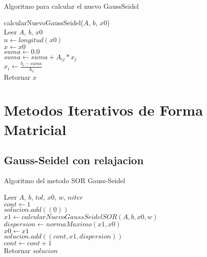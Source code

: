 \documentclass[12pt]{article}
\begin{document}
        \begin{algorithm}[H]
            \caption{Algoritmo para calcular el nuevo GaussSeidel}
            calcularNuevoGaussSeidel($A$, $b$, $x0$)\\
            Leer $A$, $b$, $x0$\\
            $n \leftarrow longitud(x0)$\\
            $x \leftarrow x0$\\
            {
                $suma \leftarrow 0.0$\\
                {
                    {
                        $suma \leftarrow suma + A_{ij} * x_j$\\
                    }
                }
                $x_i \leftarrow \frac{b_i - suma}{A_{ii}}$\\
            }
            Retornar $x$\\
        \end{algorithm}

        \section{Metodos Iterativos de Forma Matricial}

        \subsection{Gauss-Seidel con relajacion}
        \begin{algorithm}[H]
            \caption{Algoritmo del metodo SOR Gauss-Seidel}
            Leer $A$, $b$, $tol$, $x0$, $w$, $niter$\\
            $cont \leftarrow 1$\\
            $solucion.add((0))$\\
            {
                $x1 \leftarrow calcularNuevoGaussSeidelSOR(A, b, x0, w)$\\
                $dispersion \leftarrow normaMaximo(x1, x0)$\\
                $x0 \leftarrow x1$\\
                $solucion.add((cont, x1, dispersion))$\\
                $cont \leftarrow cont + 1$\\
            }
            Retornar $solucion$\\
        \end{algorithm}
\end{document}
